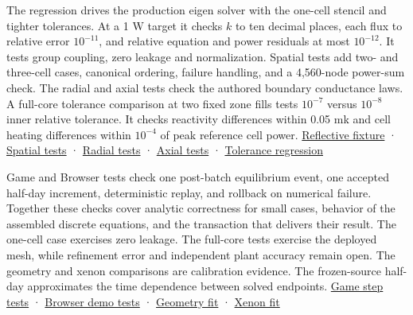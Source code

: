 \documentclass[11pt,letterpaper]{article}
\begin{document}
The regression drives the production eigen solver with the one-cell stencil and tighter
tolerances. At a 1 W target it checks \(k\) to ten decimal places, each flux to relative
error \(10^{-11}\), and relative equation and power residuals at most \(10^{-12}\). It
tests group coupling, zero leakage and normalization. Spatial tests add two- and
three-cell cases, canonical ordering, failure handling, and a 4,560-node power-sum
check. The radial and axial tests check the authored boundary conductance laws. A
full-core tolerance comparison at two fixed zone fills tests \(10^{-7}\) versus
\(10^{-8}\) inner relative tolerance. It checks reactivity differences within 0.05 mk
and cell heating differences within \(10^{-4}\) of peak reference cell power.
\href{https://github.com/hkkho/CRS/blob/4341ae8881f5827988c3d8b1859aa9e8f13cd8a6/tests/ReactorSim.Core.Tests/SingleCellReflectiveDiffusionFixtureTests.cs}{Reflective
fixture} ·
\href{https://github.com/hkkho/CRS/blob/4341ae8881f5827988c3d8b1859aa9e8f13cd8a6/tests/ReactorSim.Core.Tests/SpatialSolveTests.cs}{Spatial
tests} ·
\href{https://github.com/hkkho/CRS/blob/4341ae8881f5827988c3d8b1859aa9e8f13cd8a6/tests/ReactorSim.Core.Tests/CircularRadialBoundaryTests.cs}{Radial
tests} ·
\href{https://github.com/hkkho/CRS/blob/4341ae8881f5827988c3d8b1859aa9e8f13cd8a6/tests/ReactorSim.Core.Tests/AxialVacuumBoundaryTests.cs}{Axial
tests} ·
\href{https://github.com/hkkho/CRS/blob/4341ae8881f5827988c3d8b1859aa9e8f13cd8a6/tests/ReactorSim.Core.Tests/SpatialToleranceRegressionTests.cs}{Tolerance
regression}

Game and Browser tests check one post-batch equilibrium event, one accepted half-day
increment, deterministic replay, and rollback on numerical failure. Together these
checks cover analytic correctness for small cases, behavior of the assembled discrete
equations, and the transaction that delivers their result. The one-cell case exercises
zero leakage. The full-core tests exercise the deployed mesh, while refinement error and
independent plant accuracy remain open. The geometry and xenon comparisons are
calibration evidence. The frozen-source half-day approximates the time dependence
between solved endpoints.
\href{https://github.com/hkkho/CRS/blob/4341ae8881f5827988c3d8b1859aa9e8f13cd8a6/tests/ReactorSim.Game.Tests/DailyTurnTests.cs}{Game
step tests} ·
\href{https://github.com/hkkho/CRS/blob/4341ae8881f5827988c3d8b1859aa9e8f13cd8a6/tests/ReactorSim.Browser.Tests/DemoModeTests.cs}{Browser
demo tests} ·
\href{https://github.com/hkkho/CRS/blob/4341ae8881f5827988c3d8b1859aa9e8f13cd8a6/data/calibration/diffusion-v10/README.md}{Geometry
fit} ·
\href{https://github.com/hkkho/CRS/blob/4341ae8881f5827988c3d8b1859aa9e8f13cd8a6/docs/physics/xenon-calibration.md}{Xenon
fit}
\end{document}
